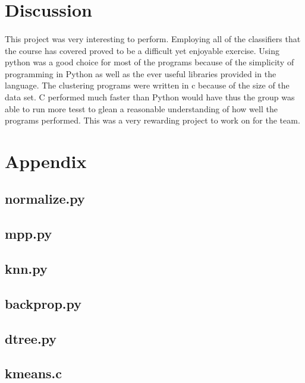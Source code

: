 \documentclass{article}
\begin{document}
\section*{Discussion}
\paragraph{}
This project was very interesting to perform. Employing all of the classifiers that the course has covered
proved to be a difficult yet enjoyable exercise. Using python was a good choice for most of the programs 
because of the simplicity of programming in Python as well as the ever useful libraries provided in the language.
The clustering programs were written in c because of the size of the data set. C performed much faster than Python would have
thus the group was able to run more tesst to glean a reasonable understanding of how well the programs performed. This was a very
rewarding project to work on for the team. 
\newpage


\appendix
\section*{Appendix}
\subsection*{normalize.py}

\newpage
\subsection*{mpp.py}

\newpage
\subsection*{knn.py}

\newpage
\subsection*{backprop.py}

\newpage
\subsection*{dtree.py}

\newpage
\subsection*{kmeans.c}

\newpage
\end{document}
